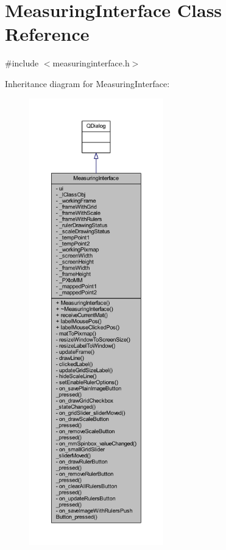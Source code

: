 \hypertarget{class_measuring_interface}{}\section{Measuring\+Interface Class Reference}
\label{class_measuring_interface}


{\ttfamily \#include $<$measuringinterface.\+h$>$}



Inheritance diagram for Measuring\+Interface\+:
\nopagebreak
\begin{figure}[H]
\begin{center}
\leavevmode
\includegraphics[height=550pt]{class_measuring_interface__inherit__graph}
\end{center}
\end{figure}


